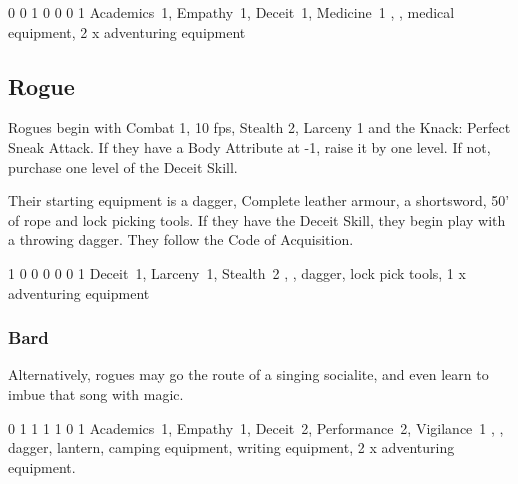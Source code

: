 {\begin{multicols}{2}

{0}%
{0}%
{{1}%
{0}%
{0}}%
{0}%
{1}%
{Academics~1, Empathy~1, Deceit~1, Medicine~1}%
{\quarterstaff, \partialchain, medical equipment, 2 x adventuring equipment}%
{\addtocounter{fp}{5}}

\subsection{Rogue}

Rogues begin with Combat 1, 10 \glspl{fp}, Stealth 2, Larceny 1 and the Knack: Perfect Sneak Attack.
If they have a Body Attribute at -1, raise it by one level.
If not, purchase one level of the Deceit Skill.

Their starting equipment is a dagger, Complete leather armour, a shortsword, 50' of rope and lock picking tools.
If they have the Deceit Skill, they begin play with a throwing dagger.
They follow the Code of Acquisition.


{1}%
{0}%
{{0}%
{0}%
{0}}%
{0}%
{1}%
{Deceit~1, Larceny~1, Stealth~2\knacks{\perfectsneakattack}}%
{\longsword, \completeleather, dagger, lock pick tools, 1 x adventuring equipment}%
{\addtocounter{fp}{5}}

\subsubsection{Bard}

Alternatively, rogues may go the route of a singing socialite, and even learn to imbue that song with magic.


{0}%
{1}%
{{1}%
{1}%
{1}}%
{0}%
{1}%
{Academics~1, Empathy~1, Deceit~2, Performance~2, Vigilance~1}%
{\longsword, \partialleather, dagger, lantern, camping equipment, writing equipment, 2 x adventuring equipment.}%
{\addtocounter{fp}{10}}


\end{multicols}}

